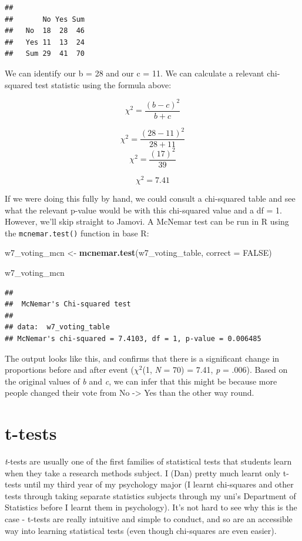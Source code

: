 \documentclass[
]{book}
\newenvironment{Shaded}{\begin{snugshade}}{\end{snugshade}}
\newcommand{\AttributeTok}[1]{\textcolor[rgb]{0.13,0.29,0.53}{#1}}
\newcommand{\ConstantTok}[1]{\textcolor[rgb]{0.56,0.35,0.01}{#1}}
\newcommand{\FunctionTok}[1]{\textcolor[rgb]{0.13,0.29,0.53}{\textbf{#1}}}
\newcommand{\NormalTok}[1]{#1}
\newcommand{\OtherTok}[1]{\textcolor[rgb]{0.56,0.35,0.01}{#1}}
\begin{document}
\begin{verbatim}
##      
##       No Yes Sum
##   No  18  28  46
##   Yes 11  13  24
##   Sum 29  41  70
\end{verbatim}

We can identify our b = 28 and our c = 11. We can calculate a relevant chi-squared test statistic using the formula above:

\[
\chi^2 = \frac{(b-c)^2}{b+c}
\]

\[
\chi^2 = \frac{(28-11)^2}{28+11}
\]
\[
\chi^2 = \frac{(17)^2}{39}
\]

\[
\chi^2 = 7.41
\]

If we were doing this fully by hand, we could consult a chi-squared table and see what the relevant p-value would be with this chi-squared value and a df = 1. However, we'll skip straight to Jamovi. A McNemar test can be run in R using the \texttt{mcnemar.test()} function in base R:

\begin{Shaded}
\begin{Highlighting}[]
\NormalTok{w7\_voting\_mcn }\OtherTok{\textless{}{-}} \FunctionTok{mcnemar.test}\NormalTok{(w7\_voting\_table, }\AttributeTok{correct =} \ConstantTok{FALSE}\NormalTok{)}

\NormalTok{w7\_voting\_mcn}
\end{Highlighting}
\end{Shaded}

\begin{verbatim}
## 
##  McNemar's Chi-squared test
## 
## data:  w7_voting_table
## McNemar's chi-squared = 7.4103, df = 1, p-value = 0.006485
\end{verbatim}

The output looks like this, and confirms that there is a significant change in proportions before and after event (\(\chi^2\)(1, \emph{N} = 70) = 7.41, \emph{p} = .006). Based on the original values of \emph{b} and \emph{c}, we can infer that this might be because more people changed their vote from No -\textgreater{} Yes than the other way round.

\hypertarget{t-tests}{%
\chapter{t-tests}\label{t-tests}}

\emph{t}-tests are usually one of the first families of statistical tests that students learn when they take a research methods subject. I (Dan) pretty much learnt only t-tests until my third year of my psychology major (I learnt chi-squares and other tests through taking separate statistics subjects through my uni's Department of Statistics before I learnt them in psychology). It's not hard to see why this is the case - t-tests are really intuitive and simple to conduct, and so are an accessible way into learning statistical tests (even though chi-squares are even easier).
\end{document}
